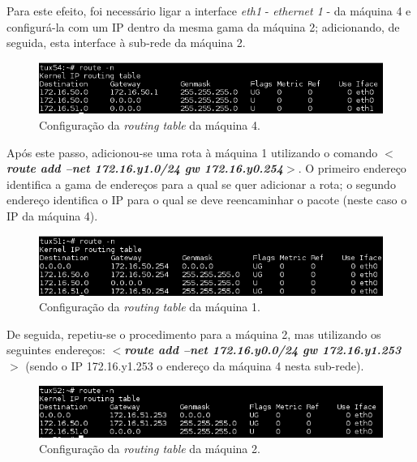 \documentclass[a4paper, 11pt]{article}
\begin{document}
Para este efeito, foi necessário ligar a interface \textit{eth1} - \textit{ethernet 1} - da máquina 4 e configurá-la com um IP dentro da mesma gama da máquina 2; adicionando, de seguida, esta interface à sub-rede da máquina 2.
\begin{figure}[h]
\centering
\includegraphics[scale=0.6]{images/Exp3_tux4_routing_table.png}
\caption{Configuração da \textit{routing table} da máquina 4.}
\label{Momentanpol}
\end{figure}

Após este passo, adicionou-se uma rota à máquina 1 utilizando o comando \textbf{\textit{$<$route add –net  172.16.y1.0/24 gw 172.16.y0.254$>$}}. O primeiro endereço identifica a gama de endereços para a qual se quer adicionar a rota; o segundo endereço identifica o IP para o qual se deve reencaminhar o pacote (neste caso o IP da máquina 4).
\begin{figure}[h]
\centering
\includegraphics[scale=0.6]{images/Exp3_tux1_routing_table.png}
\caption{Configuração da \textit{routing table} da máquina 1.}
\label{Momentanpol}
\end{figure}

De seguida, repetiu-se o procedimento para a máquina 2, mas utilizando os seguintes endereços: \textbf{\textit{$<$route add –net 172.16.y0.0/24 gw 172.16.y1.253$>$}} (sendo o IP 172.16.y1.253 o endereço da máquina 4 nesta sub-rede).
\begin{figure}[h]
\centering
\includegraphics[scale=0.6]{images/Exp3_tux2_routing_table.png}
\caption{Configuração da \textit{routing table} da máquina 2.}
\label{Momentanpol}
\end{figure}
\end{document}
